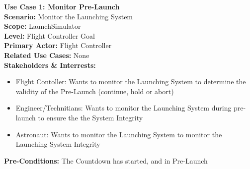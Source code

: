 \documentclass[letterpaper]{article}
\begin{document}
\noindent
\textbf{Use Case 1:  Monitor Pre-Launch}\\
\textbf{Scenario:  }Monitor the Launching System\\
\textbf{Scope:  }LaunchSimulator\\
\textbf{Level:  }Flight Controller Goal\\
\textbf{Primary Actor:  }Flight Controller\\
\textbf{Related Use Cases:  }None\\
\textbf{Stakeholders \& Interrests:}
\begin{itemize}
\item Flight Contoller:  Wants to monitor the Launching System to
determine the validity of the Pre-Launch (continue, hold or abort)
\item Engineer/Technitians:  Wants to monitor the Launching System 
during pre-launch to ensure the the System Integrity
\item Astronaut:  Wants to monitor the Launching System to monitor the
Launching System Integrity
\end{itemize}
\textbf{Pre-Conditions:  }The Countdown has started, and in
Pre-Launch\\\\
\end{document}

